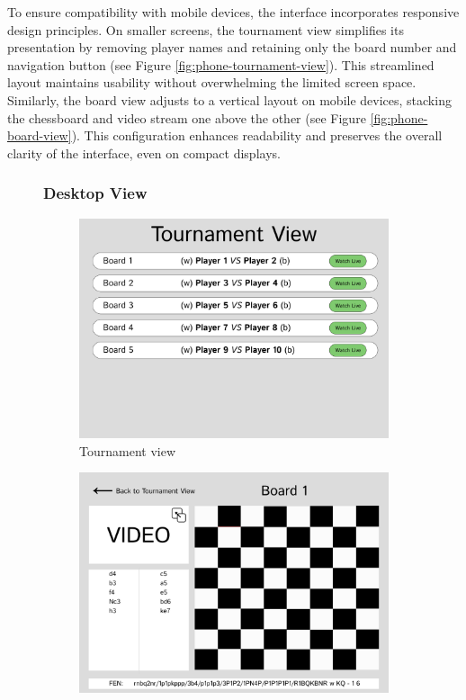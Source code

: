 To ensure compatibility with mobile devices, the interface incorporates responsive design principles. On smaller screens, the tournament view simplifies its presentation by removing player names and retaining only the board number and navigation button (see Figure \ref{fig:phone-tournament-view}). This streamlined layout maintains usability without overwhelming the limited screen space.
Similarly, the board view adjusts to a vertical layout on mobile devices, stacking the chessboard and video stream one above the other (see Figure \ref{fig:phone-board-view}). This configuration enhances readability and preserves the overall clarity of the interface, even on compact displays.


\begin{figure}[h!]
\subsubsection*{Desktop View}
    \centering
    \begin{subfigure}[h!]{0.40\linewidth}
        \centering
        \includegraphics[width=\linewidth]{figures/methods/wireframes/desktop-tournament-view.png}
        \caption{Tournament view}
        \label{fig:desktop-tournament-view}
    \end{subfigure}
    \hfill
    \begin{subfigure}[h!]{0.40\linewidth}
        \centering
        \includegraphics[width=\linewidth]{figures/methods/wireframes/desktop-board-view.png}

\end{subfigure}
\end{figure}
